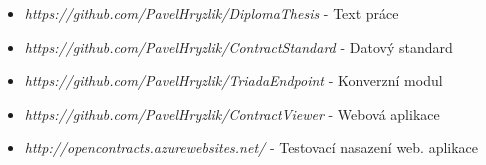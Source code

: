 \begin{itemize}
\item[] \textit{https://github.com/PavelHryzlik/DiplomaThesis} - Text práce
\item[] \textit{https://github.com/PavelHryzlik/ContractStandard} - Datový standard
\item[] \textit{https://github.com/PavelHryzlik/TriadaEndpoint} - Konverzní modul
\item[] \textit{https://github.com/PavelHryzlik/ContractViewer} - Webová aplikace
\item[] \textit{http://opencontracts.azurewebsites.net/} - Testovací nasazení web. aplikace
\end{itemize}






